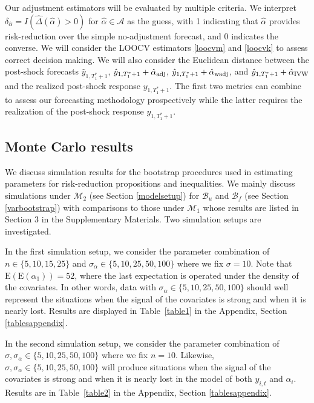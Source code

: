 \documentclass[11pt,3p,review,authoryear]{elsarticle}
\def\mc#1{\mathcal{#1}} %
\def\E#1{\mathrm{E}(#1)} %
\theoremstyle{definition}
\begin{document}
Our adjustment estimators will be evaluated by multiple criteria. We interpret $\delta_{\hat{\alpha}}= I(\hat{\Delta}(\hat{\alpha})>0)$ for $\hat{\alpha}\in \mc{A}$ as the guess, with 1 indicating that $\hat{\alpha}$ provides risk-reduction over the simple no-adjustment forecast, and 0 indicates the converse. We will consider the LOOCV estimators \eqref{loocvm} and \eqref{loocvk} to assess correct decision making. We will also consider the Euclidean distance between the post-shock forecasts $\hat{y}_{1,T_1^*+1}$, $\hat{y}_{1,T_1^*+1}+ \hat{\alpha}_{\rm adj}$, $\hat{y}_{1,T_1^*+1}+\hat{\alpha}_{\rm wadj}$, and $\hat{y}_{1,T_1^*+1}+\hat{\alpha}_{\rm IVW}$ and the realized post-shock response $y_{1,T_1^*+1}$. The first two metrics can combine to assess our forecasting methodology prospectively while the latter requires the realization of the post-shock response $y_{1,T_1^*+1}$. 



\subsection{Monte Carlo results}
\label{parametricbootstrapsimulation}

We discuss simulation results for the bootstrap procedures used in estimating parameters for risk-reduction propositions and inequalities. We mainly discuss simulations under $\mc{M}_2$ (see Section \ref{modelsetup}) for $\mc{B}_u$ and $\mc{B}_f$ (see Section \ref{varbootstrap}) with comparisons to those under $\mc{M}_1$ whose results are listed in Section 3 in the Supplementary Materials. Two simulation setups are investigated. 

In the first simulation setup, we consider the parameter combination of  $n \in \{5, 10, 15, 25\}$ and $\sigma_{\alpha} \in  \{5, 10, 25, 50, 100\}$ where we fix $\sigma=10$. Note that $\E{\E{\alpha_1}}=52$, where the last expectation is operated under the density of the covariates. In other words, data with $\sigma_{\alpha} \in  \{5, 10, 25, 50, 100\}$  should well represent the situations when the signal of the covariates is strong and when it is nearly lost. Results are displayed in Table~\ref{table1} in the Appendix, Section \ref{tablesappendix}.


In the second simulation setup, we consider the parameter combination of $\sigma, \sigma_{\alpha} \in  \{5, 10, 25, 50, 100\}$ where we fix $n=10$. Likewise, $\sigma, \sigma_{\alpha} \in  \{5, 10, 25, 50, 100\}$ will produce situations when the signal of the covariates is strong and when it is nearly lost in the model of  both $y_{i,t}$ and $\alpha_i$. Results are  in Table~\ref{table2} in the Appendix, Section \ref{tablesappendix}.
\end{document}
